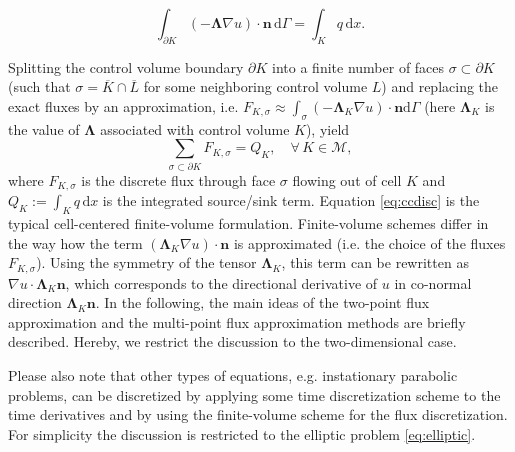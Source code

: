 \begin{equation}
    \int_{\partial K} \left( - \mathbf{\Lambda} \nabla u \right) \cdot \mathbf{n} \, \mathrm{d} \Gamma = \int_K q \, \mathrm{d}x.
    \label{eq:ellipticIntegrated}
\end{equation}

Splitting the control volume boundary $\partial K$ into a finite number of faces $\sigma \subset \partial K$ (such that $\sigma = \overline{K} \cap \overline{L}$ for some neighboring control volume $L$) and replacing the exact fluxes by an approximation, i.e. $F_{K, \sigma} \approx \int_{\sigma} \left( - \mathbf{\Lambda}_K \nabla u \right) \cdot \mathbf{n} \mathrm{d} \Gamma$ (here $\mathbf{\Lambda}_K$ is the value of $\mathbf{\Lambda}$ associated with control volume $K$), yield
\begin{equation}
    \sum_{\sigma \subset \partial K} F_{K, \sigma} = Q_K, \quad \forall \, {K \in \mathcal{M}},
\label{eq:ccdisc}
\end{equation}
where $F_{K, \sigma}$ is the discrete flux through face $\sigma$ flowing out of cell $K$ and $Q_K := \int_K q \, \mathrm{d}x$ is the integrated source/sink term. Equation \eqref{eq:ccdisc} is the typical cell-centered finite-volume formulation.
Finite-volume schemes differ in the way how the term
$(\mathbf{\Lambda}_K \nabla u ) \cdot \mathbf{n} $ is approximated (i.e. the choice of the fluxes $F_{K, \sigma}$). Using the symmetry of the tensor $\mathbf{\Lambda}_K$, this term can be rewritten as
$\nabla u  \cdot \mathbf{\Lambda}_K\mathbf{n}$, which corresponds to the directional derivative of $u$ in co-normal direction $\mathbf{\Lambda}_K\mathbf{n}$.
In the following, the main ideas of the two-point flux approximation and the multi-point flux approximation methods are briefly described. Hereby, we restrict the discussion to the two-dimensional case.

Please also note that other types of equations, e.g. instationary parabolic problems, can be discretized by applying some time discretization scheme to the time derivatives and by using the finite-volume scheme for the flux discretization. For simplicity the discussion is restricted to the elliptic problem \eqref{eq:elliptic}.

